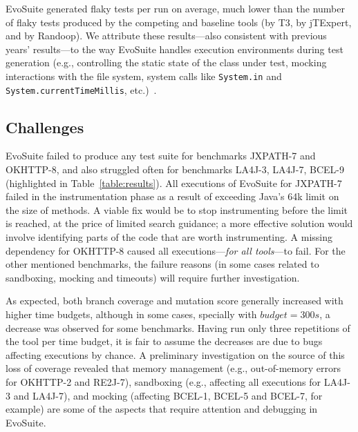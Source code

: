 \documentclass[10pt,conference]{IEEEtran}
\newcommand{\EVOSUITE}{{\sc EvoSuite}\xspace}
\newcommand{\JTEXPERT}{{\sc jTExpert}\xspace}
\newcommand{\RANDOOP}{{\sc Randoop}\xspace}
\newcommand{\TT}{{\sc T3}\xspace}
\begin{document}
\EVOSUITE generated \FlakyEvosuite flaky tests per run on average,
much lower than the number of flaky tests produced by the competing
and baseline tools (\FlakyTthree by \TT, \FlakyJtexpert by \JTEXPERT,
and \FlakyRandoop by \RANDOOP). We attribute these results---also
consistent with previous years' results---to the way \EVOSUITE handles
execution environments during test generation (e.g., controlling the
static state of the class under test, mocking interactions with the
file system, system calls like \texttt{System.in} and
\texttt{System.currentTimeMillis}, etc.)~\cite{arcuri2014automated}.


\subsection{Challenges}

\EVOSUITE failed to produce any test suite for benchmarks JXPATH-7 and
OKHTTP-8, and also struggled often for benchmarks LA4J-3, LA4J-7,
BCEL-9 (highlighted in Table~\ref{table:results}). All executions of
\EVOSUITE for JXPATH-7 failed in the instrumentation phase as a result
of exceeding Java's 64k limit on the size of methods. A viable fix
would be to stop instrumenting before the limit is reached, at the
price of limited search guidance; a more effective solution would
involve identifying parts of the code that are worth instrumenting. A
missing dependency for OKHTTP-8 caused all executions---\emph{for all
  tools}---to fail. For the other mentioned benchmarks, the failure
reasons (in some cases related to sandboxing, mocking and timeouts)
will require further investigation.

As expected, both branch coverage and mutation score generally
increased with higher time budgets, although in some cases, specially
with $budget=300s$, a decrease was observed for some
benchmarks. Having run only three repetitions of the tool per time
budget, it is fair to assume the decreases are due to bugs affecting
executions by chance. A preliminary investigation on the source of
this loss of coverage revealed that memory management (e.g.,
out-of-memory errors for OKHTTP-2 and RE2J-7), sandboxing (e.g.,
affecting all executions for LA4J-3 and LA4J-7), and mocking
(affecting BCEL-1, BCEL-5 and BCEL-7, for example) are some of the
aspects that require attention and debugging in \EVOSUITE.
\end{document}
